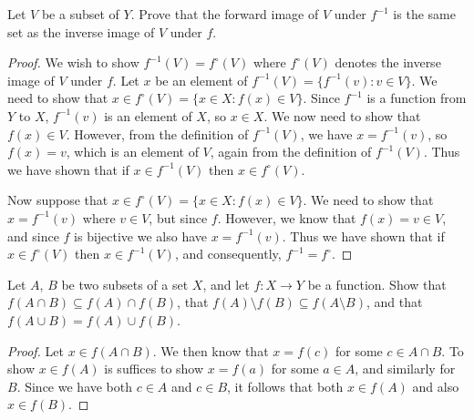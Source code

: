 \documentclass[12pt]{article}
\newenvironment{exercise}[2][Exercise]{\begin{trivlist}
\item[\hskip \labelsep {\bfseries #1}\hskip \labelsep {\bfseries #2}]}{\end{trivlist}}
\begin{document}
\begin{exercise}{3.4.1}
	Let $ V $ be a subset of $ Y $.
	Prove that the forward image of $ V $ under $ f^{-1} $ is the same set as the inverse image of $ V $ under $ f $.
\end{exercise}
\begin{proof}
	We wish to show $ f^{-1}(V) = f^{\circ}(V) $ where $ f^{\circ}(V) $ denotes the inverse image of $ V $ under $ f $.
	Let $ x $ be an element of $ f^{-1}(V) = \{ f^{-1}(v) : v \in V \} $.
	We need to show that $ x \in f^{\circ}(V) = \{ x \in X : f(x) \in V \} $.
	Since $ f^{-1} $ is a function from $ Y $ to $ X $, $ f^{-1}(v) $ is an element of $ X $, so $ x \in X $.
	We now need to show that $ f(x) \in V $.
	However, from the definition of $ f^{-1}(V) $, we have $ x = f^{-1}(v) $, so $ f(x) = v $, which is an element of $ V $, again from the definition of $ f^{-1}(V) $.
	Thus we have shown that if $ x \in f^{-1}(V) $ then $ x \in f^{\circ}(V) $.
	
	Now suppose that $ x \in f^{\circ}(V) = \{ x \in X : f(x) \in V \} $.
	We need to show that $ x = f^{-1}(v) $ where $ v \in V $, but since $ f $.
	However, we know that $ f(x) = v \in V $, and since $ f $ is bijective we also have $ x = f^{-1}(v) $.
	Thus we have shown that if $ x \in f^{\circ}(V) $ then $ x \in f^{-1}(V) $, and consequently, $ f^{-1} = f^{\circ} $.
\end{proof}

\begin{exercise}{3.4.3}
	Let $ A $, $ B $ be two subsets of a set $ X $, and let $ f : X \to Y $ be a function.
	Show that $ f(A \cap B) \subseteq f(A) \cap f(B) $, that $ f(A) \setminus f(B) \subseteq f(A \setminus B) $, and that $ f(A \cup B) = f(A) \cup f(B) $.
\end{exercise}
\begin{proof}
	Let $ x \in f(A \cap B) $.
	We then know that $ x = f(c) $ for some $ c \in A \cap B $.
	To show $ x \in f(A) $ is suffices to show $ x = f(a) $ for some $ a \in A $, and similarly for $ B $.
	Since we have both $ c \in A $ and $ c \in B $, it follows that both $ x \in f(A) $ and also $ x \in f(B) $.
\end{proof}
\end{document}
